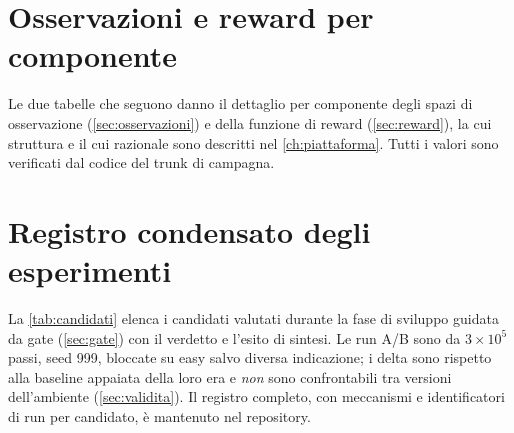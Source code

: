 
\chapter{Osservazioni e reward per componente}
\label{app:obs-reward}

Le due tabelle che seguono danno il dettaglio per componente degli spazi
di osservazione (\cref{sec:osservazioni}) e della funzione di reward
(\cref{sec:reward}), la cui struttura e il cui razionale sono descritti
nel \cref{ch:piattaforma}. Tutti i valori sono verificati dal codice del
trunk di campagna.



\chapter{Registro condensato degli esperimenti}
\label{app:registro}

La \cref{tab:candidati} elenca i candidati valutati durante la fase di
sviluppo guidata da gate (\cref{sec:gate}) con il verdetto e l'esito di
sintesi. Le run A/B sono da $3\times10^{5}$ passi, seed 999, bloccate su
easy salvo diversa indicazione; i delta sono rispetto alla baseline
appaiata della loro era e \emph{non} sono confrontabili tra versioni
dell'ambiente (\cref{sec:validita}). Il registro completo, con
meccanismi e identificatori di run per candidato, è mantenuto nel
repository.

